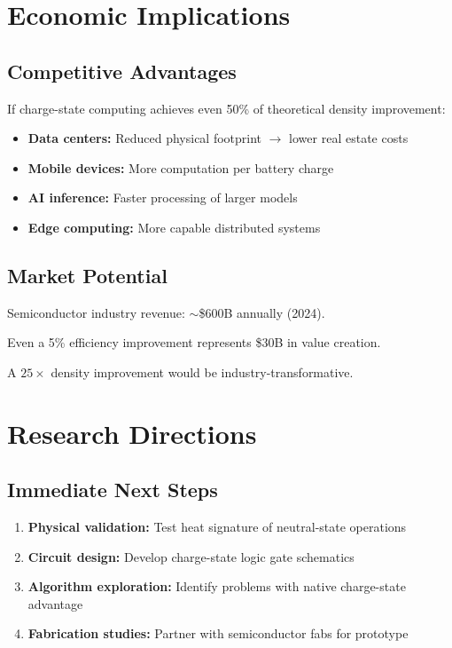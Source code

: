 \documentclass[11pt,a4paper]{article}
\begin{document}
\section{Economic Implications}

\subsection{Competitive Advantages}

If charge-state computing achieves even 50\% of theoretical density improvement:
\begin{itemize}
\item \textbf{Data centers:} Reduced physical footprint $\rightarrow$ lower real estate costs
\item \textbf{Mobile devices:} More computation per battery charge
\item \textbf{AI inference:} Faster processing of larger models
\item \textbf{Edge computing:} More capable distributed systems
\end{itemize}

\subsection{Market Potential}

Semiconductor industry revenue: $\sim$\$600B annually (2024).

Even a 5\% efficiency improvement represents \$30B in value creation.

A $25\times$ density improvement would be industry-transformative.

\section{Research Directions}

\subsection{Immediate Next Steps}

\begin{enumerate}
\item \textbf{Physical validation:} Test heat signature of neutral-state operations
\item \textbf{Circuit design:} Develop charge-state logic gate schematics
\item \textbf{Algorithm exploration:} Identify problems with native charge-state advantage
\item \textbf{Fabrication studies:} Partner with semiconductor fabs for prototype
\end{enumerate}
\end{document}
